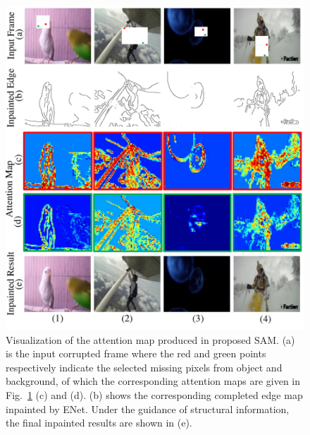 \begin{figure}[t]
	\centering
	\includegraphics[width=1.0\columnwidth]{att} %
	\caption{Visualization of the attention map produced in proposed SAM. 	
	(a) is the input corrupted frame where the red and green points respectively indicate the selected missing pixels from object and background, of which the corresponding attention maps are given in Fig.~\ref{fig:att} (c) and (d). (b) shows the corresponding completed edge map inpainted by ENet. Under the guidance of structural information, the final inpainted results are shown in (e).}
	\label{fig:att}
\end{figure}






